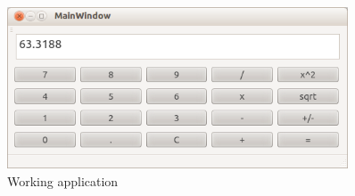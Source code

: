 \begin{figure}[H]
    \centering
    \includegraphics[width=0.9\textwidth]{screen3.png}
    \caption{Working application}
\end{figure}


